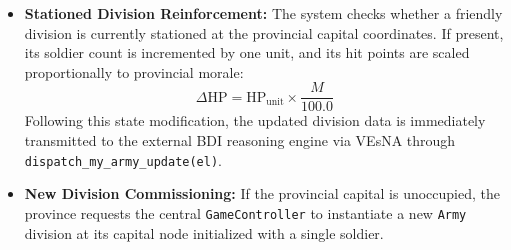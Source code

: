 \begin{itemize}
    \item \textbf{Stationed Division Reinforcement:} The system checks whether a friendly division is currently stationed at the provincial capital coordinates. If present, its soldier count is incremented by one unit, and its hit points are scaled proportionally to provincial morale:
    \begin{equation}
        \Delta \text{HP} = \text{HP}_{\text{unit}} \times \frac{M}{100.0}
    \end{equation}
    Following this state modification, the updated division data is immediately transmitted to the external BDI reasoning engine via VEsNA through \texttt{dispatch\_my\_army\_update(el)}.
    \item \textbf{New Division Commissioning:} If the provincial capital is unoccupied, the province requests the central \texttt{GameController} to instantiate a new \texttt{Army} division at its capital node initialized with a single soldier.
\end{itemize}

